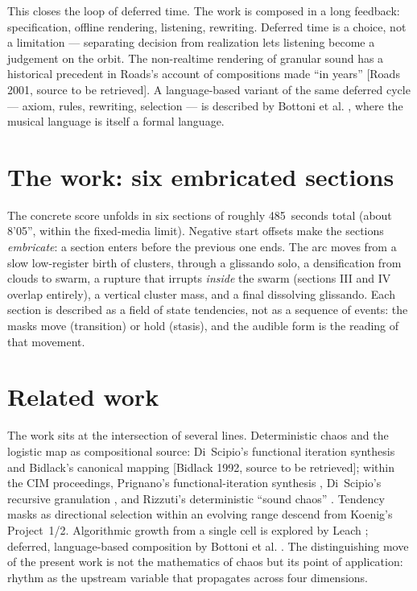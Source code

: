\documentclass{article}
\begin{document}
This closes the loop of deferred time. The work is composed in a long feedback:
specification, offline rendering, listening, rewriting. Deferred time is a
choice, not a limitation --- separating decision from realization lets listening
become a judgement on the orbit. The non-realtime rendering of granular sound
has a historical precedent in Roads's account of compositions made ``in years''
[Roads 2001, source to be retrieved]. A language-based variant of the same
deferred cycle --- axiom, rules, rewriting, selection --- is described by
Bottoni et al. \cite{Bottoni2006}, where the musical language is itself a formal
language.

\section{The work: six embricated sections}\label{sec:work}

The concrete score unfolds in six sections of roughly 485~seconds total
(about 8'05'', within the fixed-media limit). Negative start offsets make the
sections \emph{embricate}: a section enters before the previous one ends. The
arc moves from a slow low-register birth of clusters, through a glissando solo,
a densification from clouds to swarm, a rupture that irrupts \emph{inside} the
swarm (sections III and IV overlap entirely), a vertical cluster mass, and a
final dissolving glissando. Each section is described as a field of state
tendencies, not as a sequence of events: the masks move (transition) or hold
(stasis), and the audible form is the reading of that movement.

\section{Related work}\label{sec:related}

The work sits at the intersection of several lines. Deterministic chaos and the
logistic map as compositional source: Di~Scipio's functional iteration synthesis
\cite{DiScipio1990,DiScipio1999,DiScipio2001} and Bidlack's canonical mapping
[Bidlack 1992, source to be retrieved]; within the CIM proceedings, Prignano's
functional-iteration
synthesis \cite{Prignano1995}, Di~Scipio's recursive granulation
\cite{DiScipio1995}, and Rizzuti's deterministic ``sound chaos''
\cite{Rizzuti2006}. Tendency masks as directional selection within an evolving
range descend from Koenig's Project~1/2. Algorithmic growth from a single cell
is explored by Leach \cite{Leach1995}; deferred, language-based composition by
Bottoni et al. \cite{Bottoni2006}. The distinguishing move of the present work
is not the mathematics of chaos but its point of application: rhythm as the
upstream variable that propagates across four dimensions.
\end{document}
